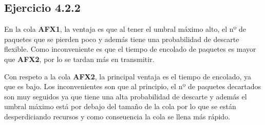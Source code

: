 \subsection{Ejercicio 4.2.2}

En la cola \textbf{AFX1}, la ventaja es que al tener el umbral máximo alto, el nº de paquetes que se pierden poco y además tiene una probabilidad
de descarte flexible. Como inconveniente es que el tiempo de encolado de paquetes es mayor que \textbf{AFX2}, por lo se tardan más en transmitir.

Con respeto a la cola \textbf{AFX2}, la principal ventaja es el tiempo de encolado, ya que es bajo. 
Los inconvenientes son que al principio, el nº de paquetes decartados son muy seguidos ya que tiene una alta probabilidad de descarte y además el
umbral máximo está por debajo del tamaño de la cola por lo que se están desperdiciando recursos y como conseuencia la cola se llena más rápido.
 

